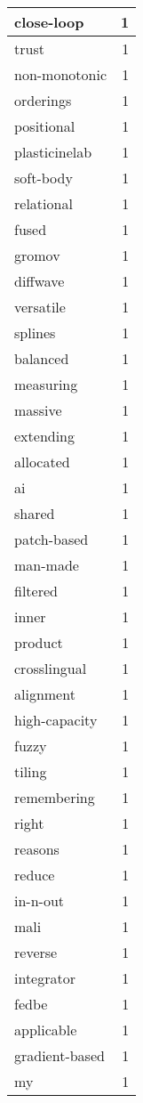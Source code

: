 \begin{table}[h]
\begin{tabular}{|l|r|}
close-loop & 1 \\
\hline
trust & 1 \\
\hline
non-monotonic & 1 \\
\hline
orderings & 1 \\
\hline
positional & 1 \\
\hline
plasticinelab & 1 \\
\hline
soft-body & 1 \\
\hline
relational & 1 \\
\hline
fused & 1 \\
\hline
gromov & 1 \\
\hline
diffwave & 1 \\
\hline
versatile & 1 \\
\hline
splines & 1 \\
\hline
balanced & 1 \\
\hline
measuring & 1 \\
\hline
massive & 1 \\
\hline
extending & 1 \\
\hline
allocated & 1 \\
\hline
ai & 1 \\
\hline
shared & 1 \\
\hline
patch-based & 1 \\
\hline
man-made & 1 \\
\hline
filtered & 1 \\
\hline
inner & 1 \\
\hline
product & 1 \\
\hline
crosslingual & 1 \\
\hline
alignment & 1 \\
\hline
high-capacity & 1 \\
\hline
fuzzy & 1 \\
\hline
tiling & 1 \\
\hline
remembering & 1 \\
\hline
right & 1 \\
\hline
reasons & 1 \\
\hline
reduce & 1 \\
\hline
in-n-out & 1 \\
\hline
mali & 1 \\
\hline
reverse & 1 \\
\hline
integrator & 1 \\
\hline
fedbe & 1 \\
\hline
applicable & 1 \\
\hline
gradient-based & 1 \\
\hline
my & 1 \\

\end{tabular}
\end{table}
